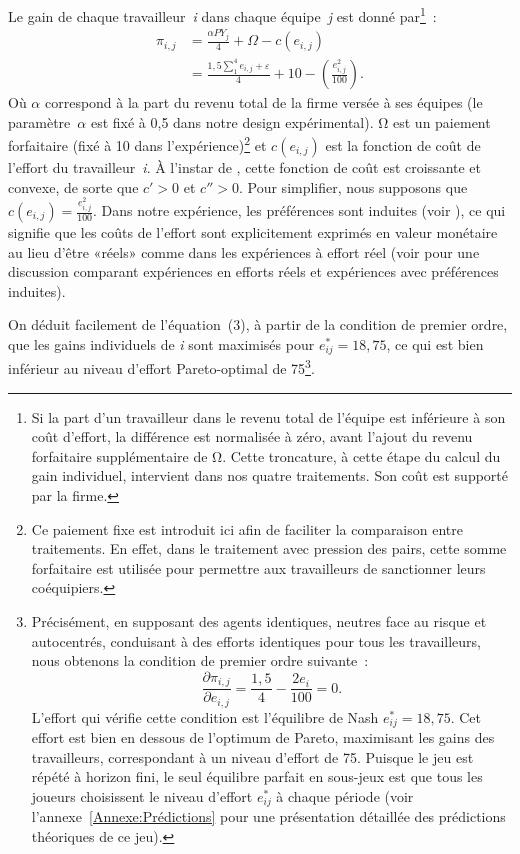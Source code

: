 \begin{Article}
\begin{refsection}[Lebourges]
Le gain de chaque travailleur~\emph{i} dans chaque équipe~\emph{j} est
donné par\footnote{Si la part d'un travailleur dans le revenu total de
  l'équipe est inférieure à son coût d'effort, la différence est
  normalisée à zéro, avant l'ajout du revenu forfaitaire supplémentaire
  de Ω. Cette troncature, à cette étape du calcul du gain individuel,
  intervient dans nos quatre traitements. Son coût est supporté par la
  firme.}~:
\begin{align}
\pi_{i,j} &= \frac{\alpha{PY}_{j}}{4} + \Omega - c\left( e_{i,j} \right) \nonumber \\
&= \frac{1,5\sum_{1}^{4}e_{i,j} + \varepsilon}{4} + 10 - \left( \frac{e_{i,j}^{2}}{100} \right).
\end{align}
Où $\alpha$ correspond à la part du revenu total de la firme versée à
ses équipes (le paramètre~$\alpha$ est fixé à 0,5 dans notre design
expérimental). Ω est un paiement forfaitaire (fixé à 10 dans
l'expérience)\footnote{Ce paiement fixe est introduit ici afin de
  faciliter la comparaison entre traitements. En effet, dans le
  traitement avec pression des pairs, cette somme forfaitaire est
  utilisée pour permettre aux travailleurs de sanctionner leurs
  coéquipiers.} et $c\left( e_{i,j} \right)$ est la fonction de coût de l'effort du travailleur~\emph{i}. À l'instar de \textcite{NalbantianSchotter1997}, cette fonction de coût est croissante
et convexe, de sorte que $c\prime>0$ et
$c''>0$. Pour simplifier, nous supposons que
\(c\left( e_{i,j} \right) = \frac{e_{i,j}^{2}}{100}.\) Dans notre
expérience, les préférences sont induites (voir \textcite{Smith1982}), ce
qui signifie que les coûts de l'effort sont explicitement exprimés en
valeur monétaire au lieu d'être «réels» comme dans les expériences à
effort réel (voir \textcite{CarpenterHuetVaughn2019} pour une
discussion comparant expériences en efforts réels et expériences avec
préférences induites).

On déduit facilement de l'équation~(3), à partir de la condition de
premier ordre, que les gains individuels de \emph{i} sont maximisés pour
\(e_{ij}^{*} = 18,75\), ce qui est bien inférieur au niveau d'effort
Pareto-optimal de 75\footnote{Précisément, en supposant des agents
  identiques, neutres face au risque et autocentrés, conduisant à des
  efforts identiques pour tous les travailleurs, nous obtenons la
  condition de premier ordre suivante~:
  \[
  \frac{\partial\pi_{i,j}}{\partial e_{i,j}} = \frac{1,5}{4} - \frac{2e_{i}}{100} = 0.
  \]
  \noindent L'effort qui vérifie cette condition est l'équilibre de Nash
  $e_{ij}^{*} = 18,75$. Cet effort est bien en dessous de l'optimum de
  Pareto, maximisant les gains des travailleurs, correspondant à un
  niveau d'effort de 75. Puisque le jeu est répété à horizon fini, le
  seul équilibre parfait en sous-jeux est que tous les joueurs
  choisissent le niveau d'effort \(e_{ij}^{*}\) à chaque période (voir
  l'annexe~\ref{Annexe:Prédictions} pour une présentation détaillée des prédictions théoriques
  de ce jeu).}.


\end{refsection}
\end{Article}
